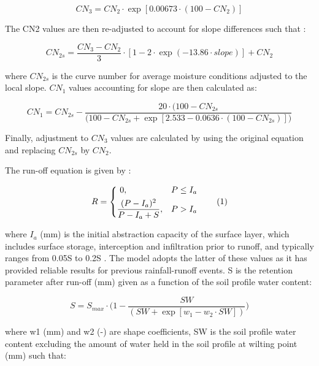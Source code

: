 \documentclass[]{article}
\begin{document}
\begin{equation}  
CN_3 = CN_2 \cdot \exp [0.00673 \cdot (100-CN_2)] 
\label{eq:CN3}  
\end{equation}

The CN2 values are then re-adjusted to account for slope differences
such that \citep{Neitsch2009}:

\begin{equation}  
CN_{2s} = \frac{CN_3 - CN_2}{3} \cdot [1-2 \cdot \exp (-13.86 \cdot slope)] + CN_2 
\label{eq:CN2s}  
\end{equation}

where \(CN_{2s}\) is the curve number for average moisture conditions
adjusted to the local slope. \(CN_1\) values accounting for slope are
then calculated as:

\begin{equation}  
CN_{1} = CN_{2s} - \frac{20 \cdot (100 - CN_{2s}}{\Big(100 - CN_{2s} + \exp [2.533-0.0636 \cdot (100 - CN_{2s})]\Big)} 
\label{eq:CN1}  
\end{equation}

Finally, adjustment to \(CN_3\) values are calculated by using the
original equation and replacing \(CN_{2s}\) by \(CN_2\).

The run-off equation is given by \cite{Neitsch2009}:

\[
    R = 
\begin{dcases}
     ~0,                                     & P \leq I_a \\
    \frac{(P-I_a)^2}{P-I_a+S},              & P > I_a 
\end{dcases}
\stepcounter{equation}\tag{\theequation}\label{eq:R}
\]

where \(I_a\) (mm) is the initial abstraction capacity of the surface
layer, which includes surface storage, interception and infiltration
prior to runoff, and typically ranges from 0.05S to 0.2S
\citep{Lim2006}. The model adopts the latter of these values as it has
provided reliable results for previous rainfall-runoff events. S is the
retention parameter after run-off (mm) given as a function of the soil
profile water content:

\begin{equation}
S = S_{max} \cdot \Big(1-\frac{SW}{(SW+ \exp[w_1-w_2 \cdot SW]  )} \Big) 
\label{eq:S}  
\end{equation}

where w1 (mm) and w2 (-) are shape coefficients, SW is the soil profile
water content excluding the amount of water held in the soil profile at
wilting point (mm) such that:
\end{document}
